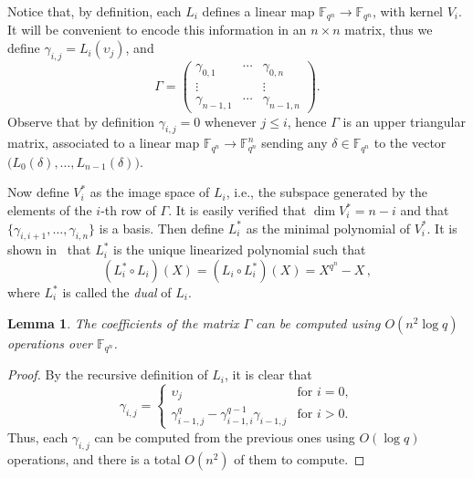 \documentclass{sig-alternate}
\newcommand{\ff}[1]{\mathbb{F}_{#1}}
\newcommand{\qq}{q}
\newcommand{\nn}{n}
\newcommand{\qn}{{\qq^\nn}}
\newcommand{\extf}{\ff{\qn}}
\newtheorem{Lem}{Lemma}
\begin{document}
Notice that, by definition, each $L_i$ defines a linear map
$\extf\to\extf$, with kernel $V_i$. It will be convenient to encode
this information in an $\nn\times\nn$ matrix, thus we define
$\gamma_{i,j}=L_i(\upsilon_j)$, and
\begin{equation}
  \label{eq:Gamma}
  \Gamma =
  \begin{pmatrix}
    \gamma_{0,1} & \cdots & \gamma_{0,\nn}\\
    \vdots & & \vdots\\
    \gamma_{\nn-1,1} & \cdots & \gamma_{\nn-1,\nn}
  \end{pmatrix}.
\end{equation}
Observe that by definition $\gamma_{i,j}=0$ whenever $j\le i$, hence
$\Gamma$ is an upper triangular matrix, associated to a linear map
$\extf\to\extf^\nn$ sending any $\delta\in\extf$ to the vector
$\bigl(L_0(\delta),\dots,\allowbreak L_{n-1}(\delta)\bigr)$.  

Now define $V_i^\ast$ as the image space of $L_i$, i.e., the subspace
generated by the elements of the $i$-th row of $\Gamma$.  It is easily verified that
$\dim V_i^\ast=n-i$ and that $\{\gamma_{i,i+1},\dots,\gamma_{i,\nn}\}$
is a basis. Then define $L_i^\ast$ as the minimal polynomial of
$V_i^\ast$. It is shown in~\cite[Ch. 11]{mBER84a} that
$L_i^\ast$ is the unique linearized polynomial such that
\begin{equation}
\label{dual_polynomial}
(L_i^\ast \circ L_i)(X)=(L_i \circ L_i^\ast)(X)=X^\qn-X\,,
\end{equation}
where $L_i^\ast$ is called the \emph{dual} of $L_i$.

\begin{Lem}
  \label{lem:gamma}
  The coefficients of the matrix $\Gamma$ can be computed using
  $O(\nn^2\log\qq)$ operations over $\extf$.
\end{Lem}
\begin{proof}
  By the recursive definition of $L_i$, it is clear that
  \begin{equation}
    \gamma_{i,j} =
    \begin{cases}
      \upsilon_j &\text{for $i=0$},\\
      \gamma_{i-1,j}^\qq - \gamma_{i-1,i}^{\qq-1}\gamma_{i-1,j} &\text{for $i>0$}.
    \end{cases}
  \end{equation}
  Thus, each $\gamma_{i,j}$ can be computed from the previous ones
  using $O(\log\qq)$ operations, and there is a total $O(\nn^2)$ of
  them to compute.
\end{proof}
\end{document}
